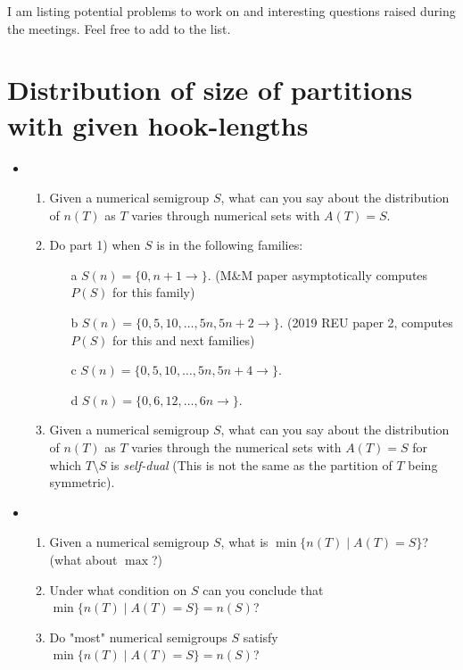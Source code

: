 \documentclass{article}
\theoremstyle{definition}
\theoremstyle{definition}
\theoremstyle{definition}
\begin{document}
I am listing potential problems to work on and interesting questions raised during the meetings. Feel free to add to the list.

\section{Distribution of size of partitions with given hook-lengths}
\begin{itemize}
    \item 
    \begin{enumerate}
    \item Given a numerical semigroup $S$, what can you say about the distribution of $n(T)$ as $T$ varies through numerical sets with $A(T)=S$.
    \item Do part 1) when $S$ is in the following families:
    \begin{enumerate}
        \item[a] $S(n)=\{0,n+1\rightarrow\}$. (M$\&$M paper asymptotically computes $P(S)$ for this family)
        \item[b] $S(n)=\{0,5,10,\dots,5n,5n+2\rightarrow\}$. (2019 REU paper 2, computes $P(S)$ for this and next families)
        \item[c] $S(n)=\{0,5,10,\dots,5n,5n+4\rightarrow\}$.
        \item[d] $S(n)=\{0,6,12,\dots,6n\rightarrow\}$.
    \end{enumerate}
    \item Given a numerical semigroup $S$, what can you say about the distribution of $n(T)$ as $T$ varies through the numerical sets with $A(T)=S$ for which $T\setminus S$ is \emph{self-dual} (This is not the same as the partition of $T$ being symmetric).
\end{enumerate}
    \item
    \begin{enumerate}
        \item Given a numerical semigroup $S$, what is $\min\{n(T)\mid A(T)=S\}$? (what about $\max$?)
        \item Under what condition on $S$ can you conclude that $\min\{n(T)\mid A(T)=S\}=n(S)$?
        \item Do "most" numerical semigroups $S$ satisfy $\min\{n(T)\mid A(T)=S\}=n(S)$?
    \end{enumerate}
\end{itemize}
\end{document}
